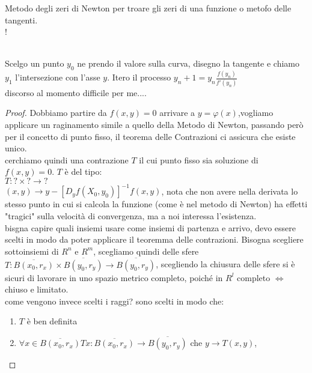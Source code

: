 \begin{theorem}
	\observation Metodo degli zeri di Newton per troare gli zeri di una funzione o metofo delle tangenti.\\
	\resizebox {\columnwidth} {!} {
	}\\
	Scelgo un punto $y_0$ ne prendo il valore sulla curva, disegno la tangente e chiamo $y_1$ l'intersezione con l'asse $y$. Itero il processo $y_n+1=y_n\frac{f(y_n)}{f'(y_n)}$\\
	discorso al momento difficile per me....\\
	\begin{proof}
		Dobbiamo partire da $f(x,y)=0$ arrivare a $y=\varphi(x)$,vogliamo applicare un raginamento simile a quello della Metodo di Newton, passando però per il concetto di punto fisso, il teorema delle Contrazioni ci assicura che esiste unico.\\
		cerchiamo quindi una contrazione $T$ il cui punto fisso sia soluzione di $f(x,y)=0$. $T$ è del tipo:\\
		$T:?\times ?\rightarrow ?$\\
		$(x,y)\rightarrow y-[D_yf(X_0,y_0)]^{-1}f(x,y)$, nota che non avere nella derivata lo stesso punto in cui si calcola la funzione (come è nel metodo di Newton) ha effetti "tragici" sulla velocità di convergenza, ma a noi interessa l'esistenza.\\
		bisgna capire quali insiemi usare come insiemi di partenza e arrivo, devo essere scelti in modo da poter applicare il teoremma delle contrazioni. Bisogna scegliere sottoinsiemi di $R^n$ e $R^m$, scegliamo quindi delle sfere\\
		$T:\overline{B(x_0,r_x)}\times\overline{B(y_0,r_y)}\rightarrow\overline{B(y_0,r_y)}$, scegliendo la chiusura delle sfere si è sicuri di lavorare in uno spazio metrico completo, poiché in $R^l$ completo $\Leftrightarrow$ chiuso e limitato.\\
		come vengono invece scelti i raggi? sono scelti in modo che:\\
		\begin{enumerate}
			\item $T$ è ben definita
			\item $\forall x \in \overline{B(x_0,r_x)} Tx: \overline{B(x_0,r_x)}\rightarrow\overline{B(y_0,r_y)}$ che $y\rightarrow T(x,y)$,\\

\end{enumerate}
\end{proof}
\end{theorem}
